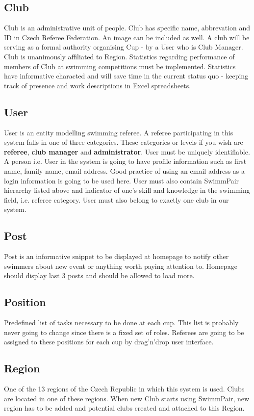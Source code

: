 \subsection*{Club}
\par
Club is an administrative unit of people. Club has specific name, abbrevation and ID in Czech Referee Federation. An image can be included as well. A club will be serving as a formal authority organising Cup - by a User who is Club Manager. Club is unanimously affiliated to Region. Statistics regarding performance of members of Club at swimming competitions must be implemented. Statistics have informative characted and will save time in the current status quo - keeping track of presence and work descriptions in Excel spreadsheets. 
\subsection*{User}
\par
User is an entity modelling swimming referee. A referee participating in this system falls in one of three categories. These categories or levels if you wish are \textbf{referee}, \textbf{club manager} and \textbf{administrator}. User must be uniquely identifiable. A person i.e. User in the system is going to have profile information such as first name, family name, email address. Good practice of using an email address as a login information is going to be used here. User must also contain SwimmPair hierarchy listed above and indicator of one's skill and knowledge in the swimming field, i.e. referee category. User must also belong to exactly one club in our system.
\subsection*{Post}
\par
Post is an informative snippet to be displayed at homepage to notify other swimmers about new event or anything worth paying attention to. Homepage should display last 3 posts and should be allowed to load more.
\subsection*{Position}
Predefined list of tasks necessary to be done at each cup. This list is probably never going to change since there is a fixed set of roles. Referees are going to be assigned to these positions for each cup by drag'n'drop user interface.
\subsection*{Region}
One of the 13 regions of the Czech Republic in which this system is used. Clubs are located in one of these regions. When new Club starts using SwimmPair, new region has to be added and potential clubs created and attached to this Region. 
\newpage
